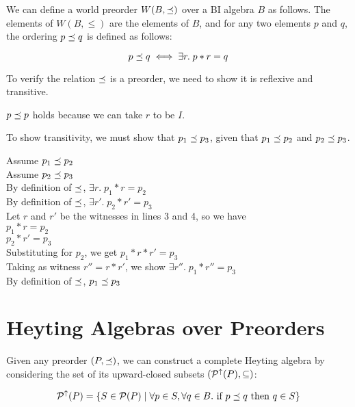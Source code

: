 We can define a world preorder $W(B, \preceq)$ over a BI algebra $B$ as
follows.  The elements of $W(B, \leq)$ are the elements of $B$, and for any
two elements $p$ and $q$, the ordering $p \preceq q$ is defined as
follows:

\begin{displaymath}
p \preceq q \iff \exists r.\; p * r = q
\end{displaymath}

To verify the relation $\preceq$ is a preorder, we need to 
show it is reflexive and transitive. 

$p \preceq p$ holds because we can take $r$ to be $I$. 


To show transitivity, we must show that $p_1 \preceq p_3$, given
that $p_1 \preceq p_2$ and $p_2 \preceq p_3$.

\begin{tabbedproof}
\oo Assume $p_1 \preceq p_2$  \\
\oo Assume $p_2 \preceq p_3$  \\
\ooo By definition of $\preceq$, $\exists r.\; p_1 * r = p_2$ \\
\ooo By definition of $\preceq$, $\exists r'.\; p_2 * r' = p_3$ \\
\ooo Let $r$ and $r'$ be the witnesses in lines 3 and 4, so we have \\
\oooo $p_1 * r = p_2$ \\
\oooo $p_2 * r' = p_3$ \\
\oooo Substituting for $p_2$, we get $p_1 * r * r' = p_3$ \\
\oooo Taking as witness $r'' = r * r'$, we show $\exists r''.\; p_1 * r'' = p_3$ \\
\ooo By definition of $\preceq$, $p_1 \preceq p_3$ \\
\end{tabbedproof}

\section{Heyting Algebras over Preorders}

Given any preorder $(P, \preceq)$, we can construct a complete
Heyting algebra by considering the set of its upward-closed subsets
$(\mathcal{P}^{\uparrow}({P}), \subseteq)$:

\begin{displaymath}
\mathcal{P}^{\uparrow}({P}) = 
  \{ S \in \mathcal{P}(P) \;|\;
     \forall p \in S, \forall q \in B. \mbox{ if } p \preceq q \mbox{ then } q \in S 
  \}
\end{displaymath}

